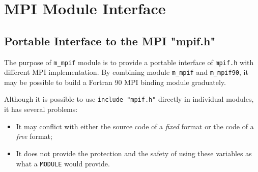 %  
%  
%  
%
 \section{MPI Module Interface}
%
\subsection{Portable Interface to the MPI "mpif.h"}
%
The purpose of \verb"m_mpif" module is to provide a portable
interface of \verb"mpif.h" with different MPI implementation.
By combining module \verb"m_mpif" and \verb"m_mpif90", it may be
possible to build a Fortran 90 MPI binding module graduately.

Although it is possible to use \verb'include "mpif.h"' directly
in individual modules, it has several problems:
\begin{itemize}
\item It may conflict with either the source code of a {\sl fixed}
      format or the code of a {\sl free} format;
\item It does not provide the protection and the safety of using
      these variables as what a \verb"MODULE" would provide.
\end{itemize}

